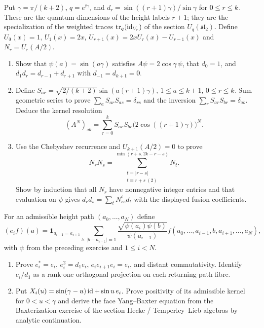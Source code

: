 \begin{exercise}
Put $\gamma=\pi/(k+2)$, $q=e^{\ii\gamma}$, and
$d_r=\sin((r+1)\gamma)/\sin\gamma$ for $0\le r\le k$.
These are the quantum dimensions of the height labels $r+1$;
they are the specialization of the weighted traces
$\operatorname{tr}_q(\operatorname{id}_{V_r})$ of the section
$U_q(\mathfrak{sl}_2)$.
Define $U_0(x)=1$, $U_1(x)=2x$,
$U_{r+1}(x)=2xU_r(x)-U_{r-1}(x)$ and
$N_r=U_r(A/2)$.
\begin{enumerate}[label=(\alph*)]
\item Show that $\psi(a)=\sin(a\gamma)$ satisfies
$A\psi=2\cos\gamma\,\psi$, that $d_0=1$, and
$d_1d_r=d_{r-1}+d_{r+1}$ with $d_{-1}=d_{k+1}=0$.
\item Define
$S_{ar}=\sqrt{2/(k+2)}\sin(a(r+1)\gamma)$,
$1\le a\le k+1$, $0\le r\le k$.
Sum geometric series to prove
$\sum_aS_{ar}S_{as}=\delta_{rs}$ and the inversion
$\sum_rS_{ar}S_{br}=\delta_{ab}$.
Deduce the kernel resolution
\[
 (A^N)_{ab}=\sum_{r=0}^k S_{ar}S_{br}
                   \bigl(2\cos((r+1)\gamma)\bigr)^N.
\]
\item Use the Chebyshev recurrence and $U_{k+1}(A/2)=0$ to prove
\[
 N_rN_s=\sum_{\substack{t=|r-s|\\t\equiv r+s\ (2)}}^{
                  \min(r+s,2k-r-s)}N_t.
\]
Show by induction that all $N_r$ have nonnegative integer
entries and that evaluation on $\psi$ gives
$d_rd_s=\sum_tN_{rs}^t d_t$ with the displayed fusion coefficients.
\end{enumerate}
\end{exercise}

\begin{exercise}
For an admissible height path $(a_0,\dots,a_N)$ define
\[
 (e_i f)(a)=\mathbf1_{a_{i-1}=a_{i+1}}
 \sum_{b:\,|b-a_{i-1}|=1}
 \frac{\sqrt{\psi(a_i)\psi(b)}}{\psi(a_{i-1})}
 f(a_0,\dots,a_{i-1},b,a_{i+1},\dots,a_N),
\]
with $\psi$ from the preceding exercise and $1\le i<N$.
\begin{enumerate}[label=(\alph*)]
\item Prove $e_i^*=e_i$, $e_i^2=d_1e_i$,
$e_ie_{i+1}e_i=e_i$, and distant commutativity.
Identify $e_i/d_1$ as a rank-one orthogonal projection on
each returning-path fibre.
\item Put $X_i(u)=\sin(\gamma-u)\operatorname{id}+\sin u\,e_i$.
Prove positivity of its admissible kernel for $0<u<\gamma$
and derive the face Yang--Baxter equation from the
Baxterization exercise of the section Hecke / Temperley--Lieb
algebras by analytic continuation.
\end{enumerate}
\end{exercise}

